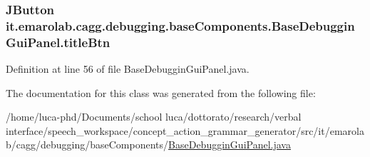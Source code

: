 \hypertarget{classit_1_1emarolab_1_1cagg_1_1debugging_1_1baseComponents_1_1BaseDebugginGuiPanel_a1a9867ee7d235de1a696c9e6c83a90a7}{
\subsubsection[{title\-Btn}]{\setlength{\rightskip}{0pt plus 5cm}J\-Button it.\-emarolab.\-cagg.\-debugging.\-base\-Components.\-Base\-Debuggin\-Gui\-Panel.\-title\-Btn\hspace{0.3cm}{\ttfamily [private]}}}\label{classit_1_1emarolab_1_1cagg_1_1debugging_1_1baseComponents_1_1BaseDebugginGuiPanel_a1a9867ee7d235de1a696c9e6c83a90a7}


Definition at line 56 of file Base\-Debuggin\-Gui\-Panel.\-java.



The documentation for this class was generated from the following file\-:\begin{DoxyCompactItemize}
\item 
/home/luca-\/phd/\-Documents/school luca/dottorato/research/verbal interface/speech\-\_\-workspace/concept\-\_\-action\-\_\-grammar\-\_\-generator/src/it/emarolab/cagg/debugging/base\-Components/\hyperlink{BaseDebugginGuiPanel_8java}{Base\-Debuggin\-Gui\-Panel.\-java}\end{DoxyCompactItemize}
